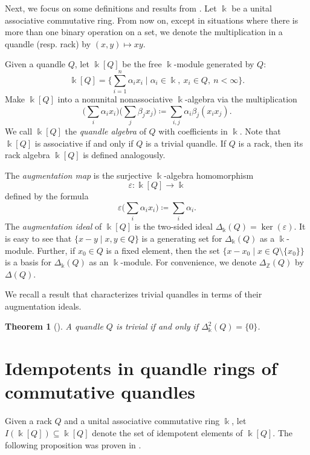 \documentclass[12 pt]{amsart}
\newtheorem{theorem}{Theorem}[section]
\theoremstyle{definition}
\theoremstyle{remark}
\numberwithin{equation}{section}
\renewcommand{\k}{\Bbbk}
\begin{document}
Next, we focus on some definitions and results from \cite{BPS}. Let $\Bbbk$ be a unital associative commutative ring. From now on, except in situations where there is more than one binary operation on a set, we denote the multiplication in a quandle (resp. rack) by $(x,y) \mapsto xy$.



Given a quandle $Q$, let  $\Bbbk[Q]$ be the free $\k$-module generated by $Q$:
$$
\Bbbk[Q] =\Big\{ \sum_{i=1}^n\alpha_i x_i \mid \alpha_i \in \Bbbk,~ x_i \in Q,~n<\infty \Big\}.
$$
Make $\k[Q]$ into a nonunital nonassociative $\k$-algebra via the multiplication  $$\big(\sum_i\alpha_i x_i\big) \big(\sum_j\beta_j x_j\big) \coloneq\sum_{i,j}\alpha_i\beta_j (x_i x_j).$$
We call $\k[Q]$ the \emph{quandle algebra} of $Q$ with coefficients in $\Bbbk$. Note that $\Bbbk[Q]$ is associative if and only if $Q$ is a trivial quandle. If $Q$ is a rack, then its rack algebra $\Bbbk[Q]$ is defined analogously.
\par

The \emph{augmentation map} is the surjective $\k$-algebra homomorphism
$$
\varepsilon \colon \Bbbk[Q] \to \Bbbk
$$
defined by the formula  $$\varepsilon \big(\sum_i\alpha_i x_i\big)\coloneq \sum_i\alpha_i .$$
The \emph{augmentation ideal} of $\k[Q]$ is the two-sided ideal $\Delta_{\Bbbk}(Q) = \ker(\varepsilon)$. It is easy to see that $\{x-y\mid x, y \in Q \}$ is  a generating set for $\Delta_{\Bbbk}(Q)$ as a $\k$-module. Further, if $x_0 \in Q$ is a fixed element, then the set $\big\{x-x_0 \mid x \in Q \setminus \{ x_0\} \big\}$ is a basis for $\Delta_{\Bbbk}(Q)$ as an $\Bbbk$-module. For convenience, we denote $\Delta_\mathbb{Z}(Q)$ by $\Delta(Q)$. 
\par

We recall a result that characterizes trivial quandles in terms of their augmentation ideals. 
\par

\begin{theorem}[{\cite[Thm.\ 3.5]{BPS}}] \label{deltasqzero}
A quandle $Q$ is trivial if and only if $\Delta_{\Bbbk}^2(Q)=\{0\}$.
\end{theorem}


\section{Idempotents in quandle rings of commutative quandles}\label{Sec 4}

Given a rack $Q$ and a unital associative commutative ring $\k$, let $I(\k[Q])\subseteq \k[Q]$ denote the set of idempotent elements of $\k[Q]$. 
The following proposition was proven in \cite{BPS-1}.
\end{document}

